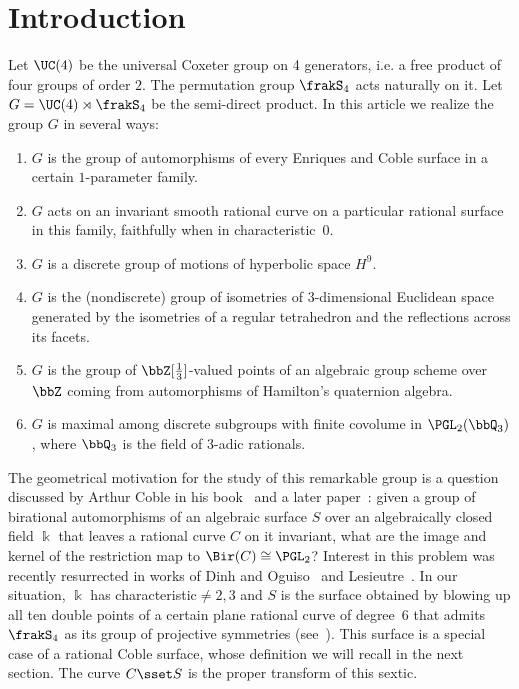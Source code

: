 \section{Introduction}

Let $\UC(4)$ be the universal Coxeter group on 4 generators, i.e. a free product of four groups of order $2$. The permutation group $\frakS_4$ acts naturally on it. Let $G = \UC(4)\rtimes \frakS_4$ be the semi-direct product. In this article we realize the group $G$ in several ways:
\begin{enumerate}
\item \label{list1.1}$G$ is the group of automorphisms of every Enriques and Coble surface in a certain $1$-parameter family.
\item \label{list1.2}$G$ acts on an invariant smooth rational curve on a particular rational surface in this family, faithfully when in characteristic~$0$.
\item \label{list1.3}$G$ is a discrete group of motions of hyperbolic space $H^9$.
\item \label{list1.4}$G$ is the (nondiscrete) group of isometries of $3$-dimensional Euclidean space generated by the isometries of a regular tetrahedron and the reflections across its facets.
\item \label{list1.5}$G$ is the group of $\bbZ[\frac13]$-valued points of an algebraic group scheme over $\bbZ$ coming from automorphisms of Hamilton's quaternion algebra.
\item \label{list1.6}$G$ is maximal among discrete subgroups with finite covolume in $\PGL_2({\bbQ}_3)$, where ${\bbQ}_3$ is the field of $3$-adic rationals.
\end{enumerate}

The geometrical motivation for the study of this remarkable group is a question discussed by Arthur Coble in his book~\cite[p.~226--227]{Coble} and a later paper~\cite{Coble2}: given a group of birational automorphisms of an algebraic surface $S$ over an algebraically closed field $\Bbbk$ that leaves a rational curve $C$ on it invariant, what are the image and kernel of the restriction map to $\Bir(C)\cong \PGL_2$? Interest in this problem was recently resurrected in works of Dinh and Oguiso~\cite{Oguiso} and Lesieutre~\cite{Lesieutre}. In our situation, $\Bbbk$ has characteristic${}\neq2,3$ and $S$ is the surface obtained by blowing up all ten double points of a certain plane rational curve of degree~6 that admits $\frakS_4$ as its group of projective symmetries (see~\cite[Section~5.4]{DolgachevSalem}). This surface is a special case of a rational Coble surface, whose definition we will recall in the next section. The curve $C\sset S$ is the proper transform of this sextic.

